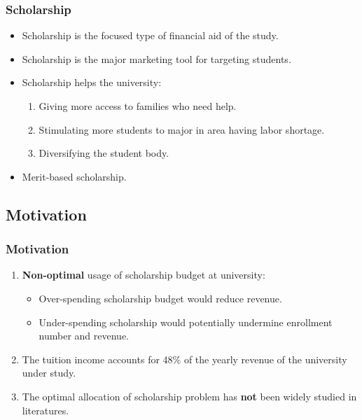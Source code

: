 \documentclass[aspectratio=169]{beamer}
\begin{document}
\begin{frame}
\frametitle{Scholarship}
\begin{itemize}
  \item Scholarship is the focused type of financial aid of the study.
  \item Scholarship is the major marketing tool for targeting students.
  \item Scholarship helps the university:
\begin{enumerate}
\item Giving more access to families who need help.
\item Stimulating more students to major in area having labor shortage.
\item Diversifying the student body.
\end{enumerate}
\item Merit-based scholarship.
\end{itemize}



\end{frame}



\subsection{Motivation}
\begin{frame}
\frametitle{Motivation}

\begin{enumerate}
\item \textbf{Non-optimal} usage of scholarship budget at 
    university: 

\begin{itemize}
\item   Over-spending scholarship budget would reduce revenue.
\item   Under-spending scholarship would potentially
undermine enrollment number and revenue. 
\end{itemize}

\item The tuition income accounts for 48\% of the 
yearly revenue of the university under study.

\item The optimal allocation of scholarship problem has 
\textbf{not} been widely studied in literatures.

\end{enumerate}
\end{frame}
\end{document}
